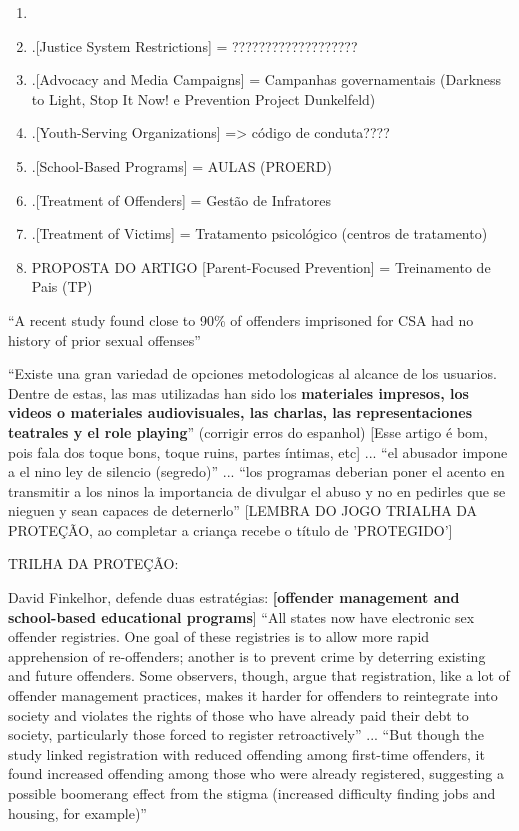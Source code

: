 \begin{enumerate}
  \item \cite{mendelson2015parent}

  \item .[Justice System Restrictions] = ???????????????????

  \item .[Advocacy and Media Campaigns] = Campanhas governamentais (Darkness to Light, Stop It Now! e Prevention Project Dunkelfeld)

  \item .[Youth-Serving Organizations] => código de conduta????

  \item .[School-Based Programs] = AULAS (PROERD)

  \item .[Treatment of Offenders] = Gestão de Infratores

  \item .[Treatment of Victims] = Tratamento psicológico (centros de tratamento)
  
  \item PROPOSTA DO ARTIGO [Parent-Focused Prevention] = Treinamento de Pais (TP)
\end{enumerate}

``A recent study found close to 90\% of offenders imprisoned for CSA had no history of prior sexual offenses'' \cite{mendelson2015parent}


``Existe una gran variedad de opciones metodologicas al alcance de los usuarios. Dentre de estas, las mas utilizadas han sido los \textbf{materiales impresos, los videos o materiales audiovisuales, las charlas, las representaciones teatrales y el role playing}'' (corrigir erros do espanhol) [Esse artigo é bom, pois fala dos toque bons, toque ruins, partes íntimas, etc] ... ``el abusador impone a el nino ley de silencio (segredo)'' ... ``los programas deberian poner el acento en transmitir a los ninos la importancia de divulgar el abuso y no en pedirles que se nieguen y sean capaces de deternerlo'' [LEMBRA DO JOGO TRIALHA DA PROTEÇÃO, ao completar a criança recebe o título de 'PROTEGIDO'] \cite{martinez2011prevencion} 

TRILHA DA PROTEÇÃO: \cite{meyer2017analise}



David Finkelhor, defende duas estratégias: \textbf{[offender management and school-based educational programs}] ``All states now have electronic sex offender registries. One goal of these registries is to allow more rapid apprehension of re-offenders; another is to prevent crime by deterring existing and future offenders. Some observers, though, argue that registration, like a lot of offender management practices, makes it harder for offenders to reintegrate into society and violates the rights of those who have already paid their debt to society, particularly those forced to register retroactively'' ... ``But though the study linked registration with reduced offending among first-time offenders, it found increased offending among those who were already registered, suggesting a possible boomerang effect from the stigma (increased difficulty finding jobs and housing, for example)'' \cite{finkelhor2009prevention}


